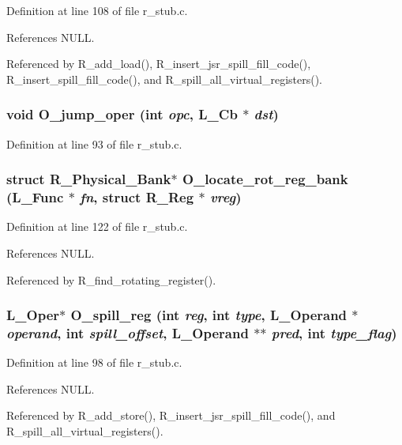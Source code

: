 Definition at line 108 of file r\_\-stub.c.

References NULL.

Referenced by R\_\-add\_\-load(), R\_\-insert\_\-jsr\_\-spill\_\-fill\_\-code(), R\_\-insert\_\-spill\_\-fill\_\-code(), and R\_\-spill\_\-all\_\-virtual\_\-registers().
\subsubsection{\setlength{\rightskip}{0pt plus 5cm}void O\_\-jump\_\-oper (int {\em opc}, L\_\-Cb $\ast$ {\em dst})}\label{r__stub_8c_795ef02c21a0a4d963037eee537203ed}




Definition at line 93 of file r\_\-stub.c.
\subsubsection{\setlength{\rightskip}{0pt plus 5cm}struct \bf{R\_\-Physical\_\-Bank}$\ast$ O\_\-locate\_\-rot\_\-reg\_\-bank (L\_\-Func $\ast$ {\em fn}, struct \bf{R\_\-Reg} $\ast$ {\em vreg})}\label{r__stub_8c_72b19a6aaebf222b09a6f101a25784e7}




Definition at line 122 of file r\_\-stub.c.

References NULL.

Referenced by R\_\-find\_\-rotating\_\-register().
\subsubsection{\setlength{\rightskip}{0pt plus 5cm}L\_\-Oper$\ast$ O\_\-spill\_\-reg (int {\em reg}, int {\em type}, L\_\-Operand $\ast$ {\em operand}, int {\em spill\_\-offset}, L\_\-Operand $\ast$$\ast$ {\em pred}, int {\em type\_\-flag})}\label{r__stub_8c_5249a2aa8d7d7d5dd3017f2381970f4e}




Definition at line 98 of file r\_\-stub.c.

References NULL.

Referenced by R\_\-add\_\-store(), R\_\-insert\_\-jsr\_\-spill\_\-fill\_\-code(), and R\_\-spill\_\-all\_\-virtual\_\-registers().
